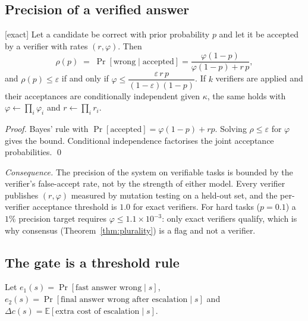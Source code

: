 \subsection{Precision of a verified answer}

\begin{theorem} \textnormal{[exact]}
\label{thm:precision}
Let a candidate be correct with prior probability $p$ and let it be accepted
by a verifier with rates $(r,\varphi)$. Then
\begin{equation}
\rho(p)\;=\;\Pr[\text{wrong}\mid\text{accepted}]
=\frac{\varphi(1-p)}{\varphi(1-p)+r\,p},
\end{equation}
and $\rho(p)\le\varepsilon$ if and only if
$\varphi\le\dfrac{\varepsilon\,r\,p}{(1-\varepsilon)(1-p)}$. If $k$ verifiers
are applied and their acceptances are conditionally independent given
$\kappa$, the same holds with $\varphi\leftarrow\prod_i\varphi_i$ and
$r\leftarrow\prod_i r_i$.
\end{theorem}
\begin{proof}
Bayes' rule with $\Pr[\text{accepted}]=\varphi(1-p)+rp$. Solving
$\rho\le\varepsilon$ for $\varphi$ gives the bound. Conditional independence
factorises the joint acceptance probabilities. \qed
\end{proof}
\emph{Consequence.} The precision of the system on verifiable tasks is
bounded by the verifier's false-accept rate, not by the strength of either
model. Every verifier publishes $(r,\varphi)$ measured by
mutation testing on a held-out set, and the per-verifier acceptance
threshold is $1.0$ for exact verifiers. For hard tasks ($p=0.1$) a $1\%$
precision target requires $\varphi\le1.1\times10^{-3}$: only exact verifiers
qualify, which is why consensus (Theorem~\ref{thm:plurality}) is a flag and not
a verifier.

\subsection{The gate is a threshold rule}

Let $e_1(s)=\Pr[\text{fast answer wrong}\mid s]$,
$e_2(s)=\Pr[\text{final answer wrong after escalation}\mid s]$ and
$\Delta c(s)=\mathbb E[\text{extra cost of escalation}\mid s]$.

